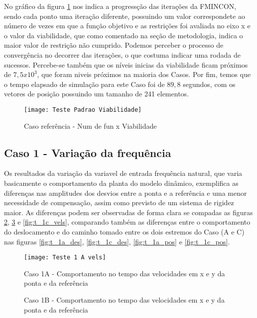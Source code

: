 No gráfico da figura \ref{fig:t_padr_viab} nos indica a progressção das iterações da FMINCON, sendo cada
ponto uma iteração diferente, possuindo um valor correspondete ao número de vezes em que a função objetivo e as restrições foi avaliada
no eixo x e o valor da viabilidade, que como comentado na seção de metodologia, indica o maior valor de restrição não cumprido.
Podemos perceber o processo de convergência no decorrer das iterações, o que costuma indicar uma rodada de sucessos.
Percebe-se também que os níveis inicias da viabilidade ficam próximos de $7,5x10^3$, que foram niveis próximos na maioria dos Casos.
Por fim, temos que o tempo elapsado de simulação para este Caso foi de $89,8$ segundos, com os vetores de posição possuindo
um tamanho de 241 elementos.

\begin{figure}[!htb]
    \begin{center}
    \caption{Caso referência - Num de fun x Viabilidade}
    \texttt{[image: Teste Padrao Viabilidade]}
    \label{fig:t_padr_viab}
    \end{center}
\end{figure}

\subsection{Caso 1 - Variação da frequência}
Os resultados da variação da variavel de entrada frequência natural, que varia basicamente o comportamento da planta do
modelo dinâmico, exemplifica as diferenças nas amplitudes dos desvios entre a ponta e a referência e uma menor necessidade de compensação, assim como previsto
de um sistema de rigidez maior.
As diferenças podem ser observadas de forma clara se compadas as figuras \ref{fig:t_1a_vels}, \ref{fig:t_1b_vels} e \ref{fig:t_1c_vels},
comparando também as diferenças entre o comportamento do deslocamento e do caminho tomado entre os dois estremos do Caso (A e C) nas figuras
\ref{fig:t_1a_des}, \ref{fig:t_1c_des}, \ref{fig:t_1a_pos} e \ref{fig:t_1c_pos}.

\begin{figure}[!htb]
    \begin{center}
    \caption{Caso 1A - Comportamento no tempo das velocidades em x e y da ponta e da referência}
    \texttt{[image: Teste 1 A vels]}
    \label{fig:t_1a_vels}
    \end{center}
\end{figure}

\begin{figure}[!htb]
    \begin{center}
    \caption{Caso 1B - Comportamento no tempo das velocidades em x e y da ponta e da referência}
    \label{fig:t_1b_vels}
    \end{center}
\end{figure}

